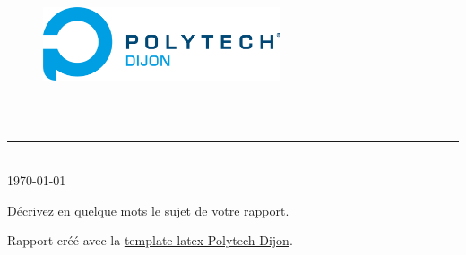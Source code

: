 \thispagestyle{empty} %
\setcounter{page}{0} %

\begin{figure}[H]
\centering
\includegraphics[width=7cm]{./Graphismes-Polytech-Dijon/logos/logo-couleur.png}
\end{figure}

\vspace{3cm}

\begin{center}

{\color{bleufPolytechDijon}\rule{\linewidth}{0.8mm}}
\vspace*{0mm}

\Huge{\textbf{\theUV \\ \thetitle}}
{\color{bleufPolytechDijon}\rule{\linewidth}{0.8mm}}

\vspace{0.5cm}
\Large{\theauthor} \\
\vspace{0.5cm}
\Large{\today}
\end{center}
 
\vspace{3cm}

\begin{myabstract}
Décrivez en quelque mots le sujet de votre rapport. \\
\end{myabstract}

\begin{credits}
Rapport créé avec la \underline{\href{https://github.com/polytech-dijon/template-latex}{template latex Polytech Dijon}}.
\end{credits}

\clearpage
